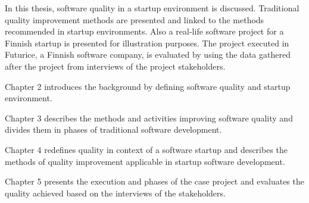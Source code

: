 
In this thesis, software quality in a startup environment is discussed. Traditional quality improvement methods are presented and linked to the methods recommended in startup environments. Also a real-life software project for a Finnish startup is presented for illustration purposes. The project executed in Futurice, a Finnish software company, is evaluated by using the data gathered after the project from interviews of the project stakeholders.


Chapter 2 introduces the background by defining software quality and startup environment.

Chapter 3 describes the methods and activities improving software quality and divides them in phases of traditional software development.

Chapter 4 redefines quality in context of a software startup and describes the methods of quality improvement applicable in startup software development.

Chapter 5 presents the execution and phases of the case project and evaluates the quality achieved based on the interviews of the stakeholders.
